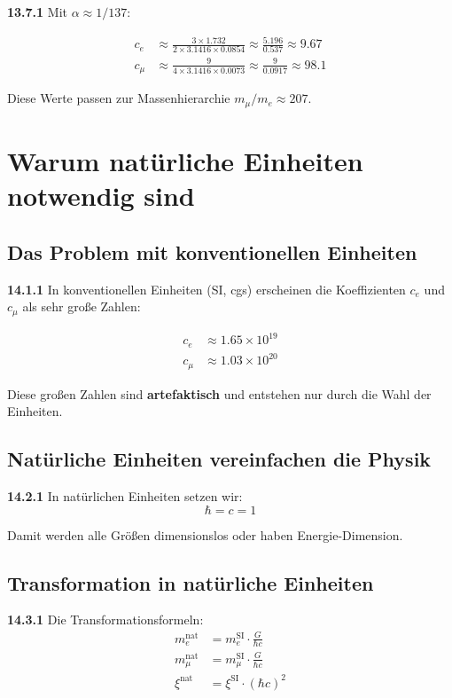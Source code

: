 \noindent \textbf{13.7.1} Mit $\alpha \approx 1/137$:

\begin{align*}
	c_e &\approx \frac{3 \times 1.732}{2 \times 3.1416 \times 0.0854} \approx \frac{5.196}{0.537} \approx 9.67 \\
	c_\mu &\approx \frac{9}{4 \times 3.1416 \times 0.0073} \approx \frac{9}{0.0917} \approx 98.1
\end{align*}

Diese Werte passen zur Massenhierarchie $m_\mu/m_e \approx 207$.

\section{Warum natürliche Einheiten notwendig sind}

\subsection{Das Problem mit konventionellen Einheiten}

\noindent \textbf{14.1.1} In konventionellen Einheiten (SI, cgs) erscheinen die Koeffizienten $c_e$ und $c_\mu$ als sehr große Zahlen:

\begin{align*}
	c_e &\approx 1.65 \times 10^{19} \\
	c_\mu &\approx 1.03 \times 10^{20}
\end{align*}

Diese großen Zahlen sind \textbf{artefaktisch} und entstehen nur durch die Wahl der Einheiten.

\subsection{Natürliche Einheiten vereinfachen die Physik}

\noindent \textbf{14.2.1} In natürlichen Einheiten setzen wir:
\[
\hbar = c = 1
\]

Damit werden alle Größen dimensionslos oder haben Energie-Dimension.

\subsection{Transformation in natürliche Einheiten}

\noindent \textbf{14.3.1} Die Transformationsformeln:
\begin{align*}
	m_e^{\text{nat}} &= m_e^{\text{SI}} \cdot \frac{G}{\hbar c} \\
	m_\mu^{\text{nat}} &= m_\mu^{\text{SI}} \cdot \frac{G}{\hbar c} \\
	\xi^{\text{nat}} &= \xi^{\text{SI}} \cdot (\hbar c)^2
\end{align*}

